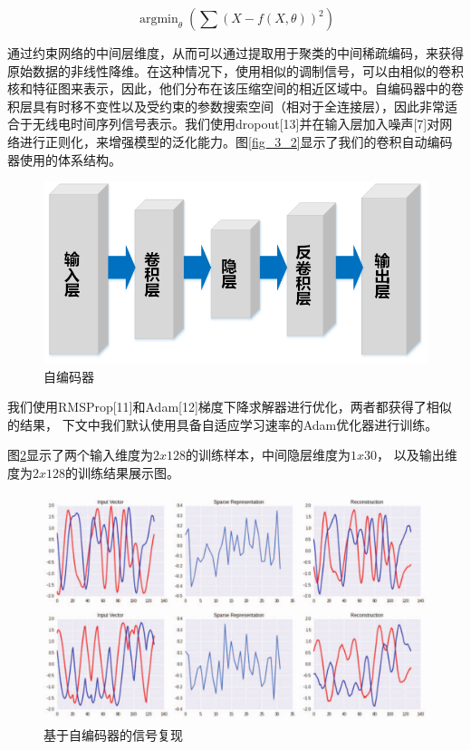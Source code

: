 \begin{equation}\label{sec:eqt3_4}
	\mathop{\arg\min}_{\theta}(\sum(X − f (X,\theta))^2)
\end{equation}

通过约束网络的中间层维度，从而可以通过提取用于聚类的中间稀疏编码，来获得原始数据的非线性降维。在这种情况下，使用相似的调制信号，可以由相似的卷积核和特征图来表示，因此，他们分布在该压缩空间的相近区域中。自编码器中的卷积层具有时移不变性以及受约束的参数搜索空间（相对于全连接层），因此非常适合于无线电时间序列信号表示。我们使用dropout[13]并在输入层加入噪声[7]对网络进行正则化，来增强模型的泛化能力。图\ref{fig_3_2}显示了我们的卷积自动编码器使用的体系结构。\par

\begin{figure}[!h]
	\centering
	\includegraphics[scale=0.6]{figures/chapter_3/fig_3_4}
	\caption{自编码器}	\label{sec:fig_3_4}
\end{figure}

我们使用RMSProp[11]和Adam[12]梯度下降求解器进行优化，两者都获得了相似的结果，
下文中我们默认使用具备自适应学习速率的Adam优化器进行训练。\par

图\ref{sec:fig_3_5}显示了两个输入维度为$2x128$的训练样本，中间隐层维度为$1x30$，
以及输出维度为$2x128$的训练结果展示图。\par
\begin{figure}[!h]
	\centering
	\includegraphics[scale=0.2]{figures/chapter_3/fig_3_5}
	\caption{基于自编码器的信号复现}	\label{sec:fig_3_5}
\end{figure} 

